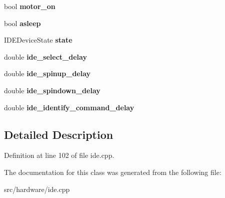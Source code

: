 \begin{DoxyCompactItemize}
\item 
\hypertarget{classIDEDevice_a89769c3383a7fc337a9c90f74d68b3d9}{bool {\bfseries motor\-\_\-on}}\label{classIDEDevice_a89769c3383a7fc337a9c90f74d68b3d9}

\item 
\hypertarget{classIDEDevice_a426ded1b443ad557e17936a460672383}{bool {\bfseries asleep}}\label{classIDEDevice_a426ded1b443ad557e17936a460672383}

\item 
\hypertarget{classIDEDevice_a36a20a48ec09fbbb26444ee4af9113b8}{I\-D\-E\-Device\-State {\bfseries state}}\label{classIDEDevice_a36a20a48ec09fbbb26444ee4af9113b8}

\item 
\hypertarget{classIDEDevice_aae577afca50523abdbf8aacc7317335d}{double {\bfseries ide\-\_\-select\-\_\-delay}}\label{classIDEDevice_aae577afca50523abdbf8aacc7317335d}

\item 
\hypertarget{classIDEDevice_aca59bb2197b37cf31821ca98e6cd1ed8}{double {\bfseries ide\-\_\-spinup\-\_\-delay}}\label{classIDEDevice_aca59bb2197b37cf31821ca98e6cd1ed8}

\item 
\hypertarget{classIDEDevice_ac1d7d6ca00bff8d765f0db43ad26297b}{double {\bfseries ide\-\_\-spindown\-\_\-delay}}\label{classIDEDevice_ac1d7d6ca00bff8d765f0db43ad26297b}

\item 
\hypertarget{classIDEDevice_aadf3fd25ff624d301e8a0ed6b92fc2c7}{double {\bfseries ide\-\_\-identify\-\_\-command\-\_\-delay}}\label{classIDEDevice_aadf3fd25ff624d301e8a0ed6b92fc2c7}

\end{DoxyCompactItemize}


\subsection{Detailed Description}


Definition at line 102 of file ide.\-cpp.



The documentation for this class was generated from the following file\-:\begin{DoxyCompactItemize}
\item 
src/hardware/ide.\-cpp\end{DoxyCompactItemize}
